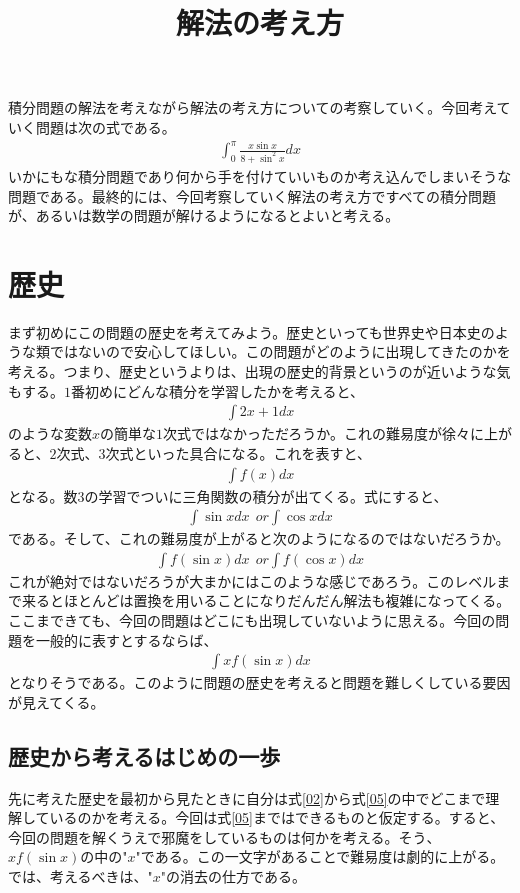 \documentclass[12pt]{jarticle}
\title{解法の考え方}
\date{}
\begin{document}
\maketitle
積分問題の解法を考えながら解法の考え方についての考察していく。今回考えていく問題は次の式である。
\begin{align*}
  \label{01}
  \displaystyle \int_0^{\pi} \frac{x\sin{x}}{8 + \sin^{2}{x}} dx \tag*{(1)}
\end{align*}
いかにもな積分問題であり何から手を付けていいものか考え込んでしまいそうな問題である。最終的には、今回考察していく解法の考え方ですべての積分問題が、あるいは数学の問題が解けるようになるとよいと考える。
\section{歴史}
まず初めにこの問題の歴史を考えてみよう。歴史といっても世界史や日本史のような類ではないので安心してほしい。この問題がどのように出現してきたのかを考える。つまり、歴史というよりは、出現の歴史的背景というのが近いような気もする。$1$番初めにどんな積分を学習したかを考えると、
\begin{align*}
  \label{02}
  \displaystyle \int 2x + 1 dx \tag*{(2)}
\end{align*}
のような変数$x$の簡単な$1$次式ではなかっただろうか。これの難易度が徐々に上がると、$2$次式、$3$次式といった具合になる。これを表すと、
\begin{align*}
  \label{03}
  \displaystyle \int f(x)  dx\tag*{(3)}
\end{align*}
となる。数$3$の学習でついに三角関数の積分が出てくる。式にすると、
\begin{align*}
  \label{04}
  \displaystyle \int \sin{x} dx \ \ or \int \cos{x} dx   \tag*{(4)}
\end{align*}
である。そして、これの難易度が上がると次のようになるのではないだろうか。
\begin{align*}
  \label{05}
  \displaystyle \int f(\sin{x})dx \ \ or \int f(\cos{x})dx  \tag*{(5)}
\end{align*}
これが絶対ではないだろうが大まかにはこのような感じであろう。このレベルまで来るとほとんどは置換を用いることになりだんだん解法も複雑になってくる。ここまできても、今回の問題はどこにも出現していないように思える。今回の問題を一般的に表すとするならば、
\begin{align*}
  \label{06}
  \displaystyle \int xf(\sin{x}) dx \tag*{(6)}
\end{align*}
となりそうである。このように問題の歴史を考えると問題を難しくしている要因が見えてくる。
\subsection{歴史から考えるはじめの一歩}
先に考えた歴史を最初から見たときに自分は式\ref{02}から式\ref{05}の中でどこまで理解しているのかを考える。今回は式\ref{05}まではできるものと仮定する。すると、今回の問題を解くうえで邪魔をしているものは何かを考える。そう、$xf(\sin{x})$の中の"$x$"である。この一文字があることで難易度は劇的に上がる。では、考えるべきは、"$x$"の消去の仕方である。
\end{document}
